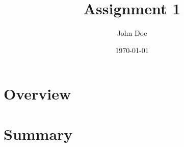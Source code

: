 \documentclass[11pt]{article}
\title{Assignment 1}
\author{John Doe}
\date{\today}
\begin{document}
\maketitle{}

\section{Overview}\label{sec:introduction}
\lipsum[5]
\parencite{for2014tdmbsoy}


\section{Summary}\label{sec:summary}
\lipsum[3]
\printbibliography{}
\end{document}
